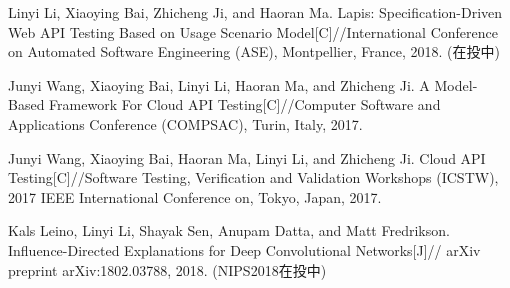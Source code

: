 \begin{resume}


    


  \begin{publications}
    \item Linyi Li, Xiaoying Bai, Zhicheng Ji, and Haoran Ma. Lapis: Specification-Driven Web API Testing Based on Usage Scenario Model[C]//International Conference on Automated Software Engineering (ASE), Montpellier, France, 2018. (在投中)
  
    \item Junyi Wang, Xiaoying Bai, Linyi Li, Haoran Ma, and Zhicheng Ji. A Model-Based Framework For Cloud API Testing[C]//Computer Software and Applications Conference (COMPSAC), Turin, Italy, 2017.
    
    \item Junyi Wang, Xiaoying Bai, Haoran Ma, Linyi Li, and Zhicheng Ji. Cloud API Testing[C]//Software Testing, Verification and Validation Workshops (ICSTW), 2017 IEEE International Conference on, Tokyo, Japan, 2017.
  
    \item  Kals Leino, Linyi Li, Shayak Sen, Anupam Datta, and Matt Fredrikson. Influence-Directed Explanations for Deep Convolutional Networks[J]// arXiv preprint arXiv:1802.03788, 2018. (NIPS2018在投中)
  
  \end{publications}

\end{resume}
